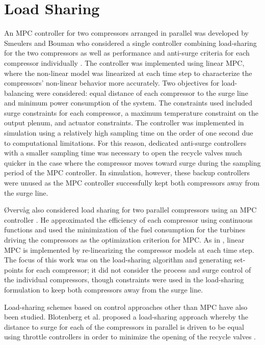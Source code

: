 \section{Load Sharing}

An MPC controller for two compressors arranged in parallel was developed by Smeulers and Bouman who considered a single controller combining load-sharing for the two compressors as well as performance and anti-surge criteria for each compressor individually \cite{Smeulers1999}. 
The controller was implemented using linear MPC, where the non-linear model was linearized at each time step to characterize the compressors' non-linear behavior more accurately.
Two objectives for load-balancing were considered: equal distance of each compressor to the surge line and minimum power consumption of the system. 
The constraints used included surge constraints for each compressor, a maximum temperature constraint on the output plenum, and actuator constraints.
The controller was implemented in simulation using a relatively high sampling time on the order of one second due to computational limitations. 
For this reason, dedicated anti-surge controllers with a smaller sampling time was necessary to open the recycle valves much quicker in the case where the compressor moves toward surge during the sampling period of the MPC controller. 
In simulation, however, these backup controllers were unused as the MPC controller successfully kept both compressors away from the surge line.

Øvervåg also considered load sharing for two parallel compressors using an MPC controller \cite{Oevervaag2013}. 
He approximated the efficiency of each compressor using continuous functions and used the minimization of the fuel consumption for the turbines driving the compressors as the optimization criterion for MPC. 
As in \cite{Smeulers1999}, linear MPC is implemented by re-linearizing the compressor models at each time step.
The focus of this work was on the load-sharing algorithm and generating set-points for each compressor; it did not consider the process and surge control of the individual compressors, though constraints were used in the load-sharing formulation to keep both compressors away from the surge line.

Load-sharing schemes based on control approaches other than MPC have also been studied. 
Blotenberg et al. proposed a load-sharing approach whereby the distance to surge for each of the compressors in parallel is driven to be equal using throttle controllers in order to minimize the opening of the recycle valves \cite{Blotenberg1984}. 

